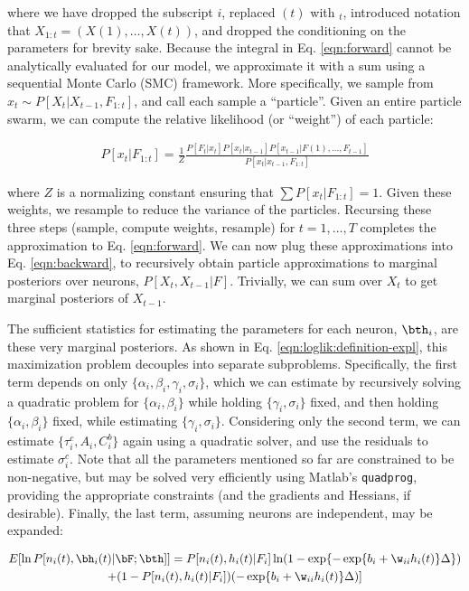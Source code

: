 \noindent where we have dropped the subscript $i$, replaced $(t)$ with $_t$, introduced notation that $X_{1:t}=(X(1),\ldots, X(t))$, and dropped the conditioning on the parameters for brevity sake.  Because the integral in Eq. \eqref{eqn:forward} cannot be analytically evaluated for our model, we approximate it with a sum using a sequential Monte Carlo (SMC) framework.  More specifically, we sample  from $x_t \sim P[X_t | X_{t-1}, F_{1:t}]$, and call each sample a ``particle''.  Given an entire particle swarm, we can compute the relative likelihood (or ``weight'') of each particle:

\begin{align}
	P[x_t | F_{1:t}] = \frac{1}{Z}\frac{P[F_t | x_t] P[x_t | x_{t-1}] P[x_{t-1} | F(1), \ldots, F_{t-1}]} {P[x_t | x_{t-1}, F_{1:t}]}
\end{align}

\noindent where $Z$ is a normalizing constant ensuring that $\sum P[x_t | F_{1:t}]=1$.  Given these weights, we resample to reduce the variance of the particles.  Recursing these three steps (sample, compute weights, resample) for $t=1, \ldots, T$ completes the approximation to Eq. \eqref{eqn:forward}.  We can now plug these approximations into Eq. \eqref{eqn:backward}, to recursively obtain particle approximations to marginal posteriors over neurons, $P[X_t, X_{t-1} | F]$.  Trivially, we can sum over $X_t$ to get marginal posteriors of $X_{t-1}$.

The sufficient statistics for estimating the parameters for each neuron, $\bth_i$, are these very marginal posteriors.  As shown in Eq. \eqref{eqn:loglik:definition-expl}, this maximization problem decouples into separate subproblems.  Specifically, the first term depends on only $\{\alpha_i, \beta_i, \gamma_i, \sigma_i\}$, which we can estimate by recursively solving a quadratic problem for $\{\alpha_i, \beta_i\}$ while holding $\{\gamma_i, \sigma_i\}$ fixed, and then holding $\{\alpha_i, \beta_i\}$ fixed, while estimating $\{\gamma_i,\sigma_i\}$.  Considering only the second term, we can estimate $\{\tau_i^c, A_i, C_i^b\}$ again using a quadratic solver, and use the residuals to estimate $\sigma_i^c$.  Note that all the parameters mentioned so far are constrained to be non-negative, but may be solved very efficiently using Matlab's \texttt{quadprog}, providing the appropriate constraints (and the gradients and Hessians, if desirable).  Finally, the last term, assuming neurons are independent,  may be expanded:

\begin{multline} \label{eqn:bw}
	E [\ln P[n_i(t), \bh_i(t) | \bF; \bth]] = P[n_i(t), h_i(t) | F_i] \ln (1-\exp\{-\exp\{b_i + \w_{ii} h_i(t)\}\Delta\})
	\\ +  (1-P[n_i(t), h_i(t) | F_i]) (-\exp\{b_i + \w_{ii} h_i(t)\}\Delta)] 
\end{multline}

